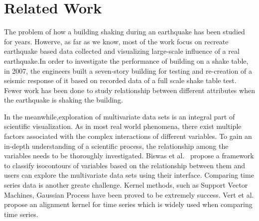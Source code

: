 \section{Related Work}
\label{sec:related}
The problem of how a building shaking during an earthquake has been studied for years.
Howerve, as far as we know, most of the work focus on recreate earthquake based data collected and visualizing large-scale influence of a real earthquake.In order to investigate the performance of building on a shake table, in 2007, the engineers built a seven-story building for testing and  re-creation of a seismic response of it  based on recorded data of a full scale shake table test.  ~\cite{Chourasia:2007:DRS:1247238.1247243} Fewer work has been done to study relationship between different attributes when the earthquake is shaking the building.

In the meanwhile,exploration of multivariate data sets is an integral part of scientific visualization. As in most real world phenomena, there exist multiple factors associated with the complex interactions of different variables. To gain an in-depth understanding of a scientific process, the relationship among the variables needs to be thoroughly investigated. Biswas et al.~\cite{Biswas:2013:AIFEMDS:1077-2626} propose a framework to classify isocontours of variables based on the relationship between them and users can explore the multivariate data sets using their interface. Comparing time series data is another greate challenge. Kernel methods, such as Support Vector Machines, Gaussian Process have been proved to be extremely success. Vert et al. propose an alignment kernel for time series which is widely used when comparing time series. ~\cite{DBLP:journals/corr/abs-cs-0610033} 

